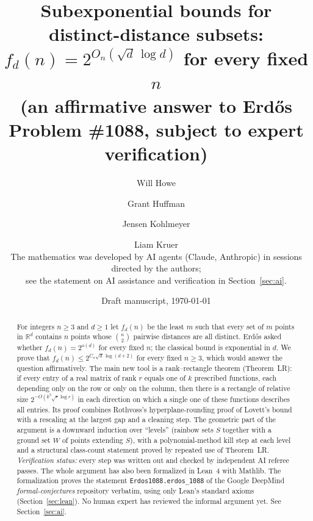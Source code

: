 \documentclass[11pt]{article}
\title{Subexponential bounds for distinct-distance subsets:\\
$f_d(n)=2^{O_n(\sqrt d\,\log d)}$ for every fixed $n$\\[4pt]
\large (an affirmative answer to Erd\H{o}s Problem \#1088, subject to expert verification)}
\author{%
Will Howe \and Grant Huffman \and Jensen Kohlmeyer \and Liam Kruer\\[4pt]
\small The mathematics was developed by AI agents (Claude, Anthropic) in sessions directed by the authors;\\
\small see the statement on AI assistance and verification in Section~\ref{sec:ai}.}
\date{Draft manuscript, \today}
\theoremstyle{definition}
\theoremstyle{remark}
\newcommand{\R}{\mathbb{R}}
\begin{document}
\maketitle

\begin{abstract}
For integers $n\ge 3$ and $d\ge 1$ let $f_d(n)$ be the least $m$ such that every set of $m$ points in $\R^d$
contains $n$ points whose $\binom n2$ pairwise distances are all distinct. Erd\H{o}s asked whether
$f_d(n)=2^{o(d)}$ for every fixed $n$; the classical bound is exponential in $d$. We prove that
$f_d(n)\le 2^{C_n\sqrt d\,\log(d+2)}$ for every fixed $n\ge 3$, which would answer the question
affirmatively. The main new tool is a rank--rectangle theorem (Theorem~LR): if every entry of a real matrix of
rank $r$ equals one of $k$ prescribed functions, each depending only on the row or only on the column, then
there is a rectangle of relative size $2^{-O(k^3\sqrt{r}\log r)}$ in each direction on which a single one of these
functions describes all entries. Its proof combines Rothvoss's hyperplane-rounding proof of Lovett's
bound with a rescaling at the largest gap and a cleaning step. The geometric part of the argument is a
downward induction over ``levels'' (rainbow sets $S$ together with a ground set $W$ of points extending $S$),
with a polynomial-method kill step at each level and a structural class-count statement proved by repeated use
of Theorem~LR. \emph{Verification status:} every step was written out and checked by independent AI referee
passes. The whole argument has also been formalized in Lean~4 with Mathlib. The formalization proves the statement
\texttt{Erdos1088.erdos\_1088} of the Google DeepMind \emph{formal-conjectures} repository verbatim, using only
Lean's standard axioms (Section~\ref{sec:lean}). No human expert has reviewed the informal argument yet.
See Section~\ref{sec:ai}.
\end{abstract}

\tableofcontents















\end{document}
